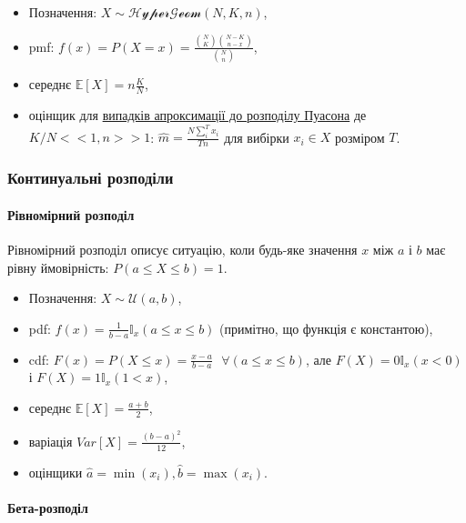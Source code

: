 \documentclass[
  11pt,
]{book}
\begin{document}
\begin{itemize}
\item
  Позначення: \(X \sim \mathcal{HyperGeom}(N, K, n)\),
\item
  pmf: \(f(x) = P(X = x) = \frac{\binom{N}{K} \binom{N-K}{n - x}}{\binom{N}{n}}\),
\item
  середнє \(\mathbb{E} [X] = n \frac{K}{N}\),
\item
  оцінщик для \href{https://math.stackexchange.com/questions/40319/maximum-likelihood-estimate-of-hypergeometric-distribution-parameter}{випадків апроксимації до розподілу Пуасона} де \(K/N << 1, n >> 1\): \(\hat{m} = \frac{N \sum \limits_i^T x_i}{Tn}\) для вибірки \(x_i \in X\) розміром \(T\).
\end{itemize}

\subsubsection{Континуальні розподіли}\label{ux43aux43eux43dux442ux438ux43dux443ux430ux43bux44cux43dux456-ux440ux43eux437ux43fux43eux434ux456ux43bux438}

\paragraph{Рівномірний розподіл}\label{ux440ux456ux432ux43dux43eux43cux456ux440ux43dux438ux439-ux440ux43eux437ux43fux43eux434ux456ux43b}

Рівномірний розподіл описує ситуацію, коли будь-яке значення \(x\) між \(a\) і \(b\) має рівну ймовірність: \(P(a \leq X \leq b) = 1\).

\begin{itemize}
\item
  Позначення: \(X \sim \mathcal{U}(a, b)\),
\item
  pdf: \(f(x) = \frac{1}{b-a} \mathbb{I}_x (a \leq x \leq b)\) (примітно, що функція є константою),
\item
  cdf: \(F(x) = P(X \leq x) = \frac{x-a}{b-a} \text { } \forall (a \leq x \leq b)\), але \(F(X) = 0 \mathbb{I}_x(x < 0)\) і \(F(X) = 1 \mathbb{I}_x (1 < x)\),
\item
  середнє \(\mathbb{E} [X] = \frac{a+b}{2}\),
\item
  варіація \(Var[X] = \frac{(b-a)^2}{12}\),
\item
  оцінщики \(\hat{a} = \min(x_i), \hat{b} = \max(x_i)\).
\end{itemize}

\paragraph{Бета-розподіл}\label{ux431ux435ux442ux430-ux440ux43eux437ux43fux43eux434ux456ux43b}
\end{document}
